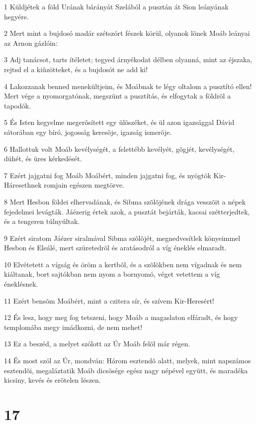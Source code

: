 \par 1 Küldjétek a föld Urának bárányát Szelából a pusztán át Sion leányának hegyére.
\par 2 Mert mint a bujdosó madár szétszórt fészek körül, olyanok lõnek Moáb leányai az Arnon gázlóin:
\par 3 Adj tanácsot, tarts ítéletet; tegyed árnyékodat délben olyanná, mint az éjszaka, rejtsd el a kiûzötteket, és a bujdosót ne add ki!
\par 4 Lakozzanak benned menekültjeim, és Moábnak te légy oltalom a pusztító ellen! Mert vége a nyomorgatónak, megszünt a pusztítás, és elfogytak a földrõl a tapodók.
\par 5 És Isten kegyelme megerõsített egy ülõszéket, és ül azon igazsággal Dávid sátorában egy bíró, jogosság keresõje, igazság ismerõje.
\par 6 Hallottuk volt Moáb kevélységét, a felettébb kevélyét, gõgjét, kevélységét, dühét, és üres kérkedését.
\par 7 Ezért jajgatni fog Moáb Moábért, minden jajgatni fog, és nyögtök Kir-Háresethnek romjain egészen megtörve.
\par 8 Mert Hesbon földei elhervadának, és Sibma szõlõjének drága vesszõit a népek fejedelmei levágták. Jáézerig értek azok, a pusztát bejárták, kacsai szétterjedtek, és a tengeren túlnyúltak.
\par 9 Ezért siratom Jáézer siralmával Sibma szõlõjét, megnedvesítlek könyeimmel Hesbon és Eleálé, mert szüretedrõl és aratásodról a víg éneklés elmaradt.
\par 10 Elvétetett a vígság és öröm a kertbõl, és a szõlõkben nem vígadnak és nem kiáltanak, bort sajtókban nem nyom a bornyomó, véget vetettem a víg éneklésnek.
\par 11 Ezért bensõm Moábért, mint a czitera sír, és szívem Kir-Heresért!
\par 12 És lesz, hogy meg fog tetszeni, hogy Moáb a magaslaton elfáradt, és hogy templomába megy imádkozni, de nem mehet!
\par 13 Ez a beszéd, a melyet szólott az Úr Moáb felõl már régen.
\par 14 És most szól az Úr, mondván: Három esztendõ alatt, melyek, mint napszámos esztendõi, megaláztatik Moáb dicsõsége egész nagy népével együtt, és maradéka kicsiny, kevés és erõtelen lészen.

\chapter{17}

